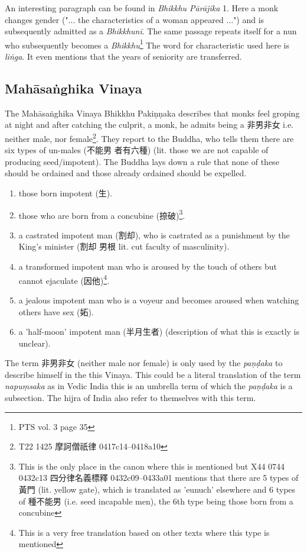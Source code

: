 An interesting paragraph can be found in ­{\em Bhikkhu Pā­rāji­ka} 1. Here a monk changes gender ("... the characteristics of a woman appeared ...") and is subsequently admitted as a {\em Bhikkhunī}. The same passage repeats itself for a nun who subsequently becomes a {\em Bhikkhu}\footnote{PTS vol. 3 page 35} The word for characteristic used here is {\em liṅga}. It even mentions that the years of seniority are transferred.


\subsection{Mahāsaṅghika Vinaya}
The Mahāsaṅghika Vinaya Bhikkhu Pakiṇṇaka describes that monks feel groping at night and after catching the culprit, a monk, he admits being a 非男非女 i.e. neither male, nor female\footnote{T22 1425 摩訶僧祇律 0417c14–0418a10}. They report to the Buddha, who tells them there are six types of un-males (不能男 者有六種) (lit. those we are not capable of producing seed/impotent). The Buddha lays down a rule that none of these should be ordained and those already ordained should be expelled.

\begin{enumerate}
\item those born impotent (生). 
\item those who are born from a concubine (捺破)\footnote{This is the only place in the canon where this is mentioned but X44 0744 0432c13 四分律名義標釋 0432c09–0433a01 mentions that there are 5 types of 黃門 (lit. yellow gate), which is translated as 'eunuch' elsewhere and 6 types of 種不能男 (i.e. seed incapable men), the 6th type being those born from a concubine}.
\item a castrated impotent man (割却), who is castrated as a punishment by the King's minister (割却 男根 lit. cut faculty of masculinity).
\item a transformed impotent man who is aroused by the touch of others but cannot ejaculate (因他)\footnote{This is a very free translation based on other texts where this type is mentioned}.
\item a jealous impotent man who is a voyeur and becomes aroused when watching others have sex (妬).
\item a 'half-moon' impotent man (半月生者) (description of what this is exactly is unclear).
\end{enumerate}

The term 非男非女 (neither male nor female) is only used by the {\em paṇḍaka} to describe himself in the this Vinaya. This could be a literal translation of the term {\em napuṃsaka} as in Vedic India this is an umbrella term of which the {\em paṇḍaka} is a subsection. The hijra of India also refer to themselves with this term.

